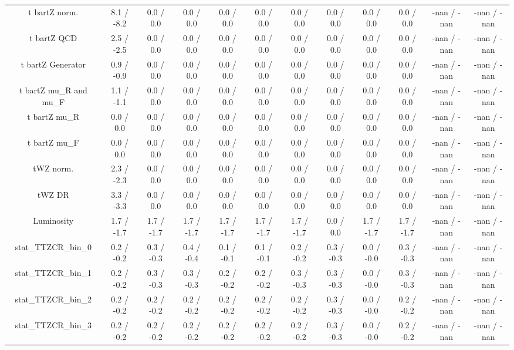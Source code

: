\begin{table}[htbp]
\begin{center}
\begin{tabular}{|c|c|c|c|c|c|c|c|c|c|c|c|}
  t bar{t}Z norm. & 8.1 / -8.2 & 0.0 / 0.0 & 0.0 / 0.0 & 0.0 / 0.0 & 0.0 / 0.0 & 0.0 / 0.0 & 0.0 / 0.0 & 0.0 / 0.0 & 0.0 / 0.0 & -nan / -nan & -nan / -nan \\ 
  t bar{t}Z QCD & 2.5 / -2.5 & 0.0 / 0.0 & 0.0 / 0.0 & 0.0 / 0.0 & 0.0 / 0.0 & 0.0 / 0.0 & 0.0 / 0.0 & 0.0 / 0.0 & 0.0 / 0.0 & -nan / -nan & -nan / -nan \\ 
  t bar{t}Z Generator & 0.9 / -0.9 & 0.0 / 0.0 & 0.0 / 0.0 & 0.0 / 0.0 & 0.0 / 0.0 & 0.0 / 0.0 & 0.0 / 0.0 & 0.0 / 0.0 & 0.0 / 0.0 & -nan / -nan & -nan / -nan \\ 
  t bar{t}Z  mu_{R} and  mu_{F} & 1.1 / -1.1 & 0.0 / 0.0 & 0.0 / 0.0 & 0.0 / 0.0 & 0.0 / 0.0 & 0.0 / 0.0 & 0.0 / 0.0 & 0.0 / 0.0 & 0.0 / 0.0 & -nan / -nan & -nan / -nan \\ 
  t bar{t}Z  mu_{R} & 0.0 / 0.0 & 0.0 / 0.0 & 0.0 / 0.0 & 0.0 / 0.0 & 0.0 / 0.0 & 0.0 / 0.0 & 0.0 / 0.0 & 0.0 / 0.0 & 0.0 / 0.0 & -nan / -nan & -nan / -nan \\ 
  t bar{t}Z  mu_{F} & 0.0 / 0.0 & 0.0 / 0.0 & 0.0 / 0.0 & 0.0 / 0.0 & 0.0 / 0.0 & 0.0 / 0.0 & 0.0 / 0.0 & 0.0 / 0.0 & 0.0 / 0.0 & -nan / -nan & -nan / -nan \\ 
  tWZ norm. & 2.3 / -2.3 & 0.0 / 0.0 & 0.0 / 0.0 & 0.0 / 0.0 & 0.0 / 0.0 & 0.0 / 0.0 & 0.0 / 0.0 & 0.0 / 0.0 & 0.0 / 0.0 & -nan / -nan & -nan / -nan \\ 
  tWZ DR & 3.3 / -3.3 & 0.0 / 0.0 & 0.0 / 0.0 & 0.0 / 0.0 & 0.0 / 0.0 & 0.0 / 0.0 & 0.0 / 0.0 & 0.0 / 0.0 & 0.0 / 0.0 & -nan / -nan & -nan / -nan \\ 
  Luminosity & 1.7 / -1.7 & 1.7 / -1.7 & 1.7 / -1.7 & 1.7 / -1.7 & 1.7 / -1.7 & 1.7 / -1.7 & 0.0 / 0.0 & 1.7 / -1.7 & 1.7 / -1.7 & -nan / -nan & -nan / -nan \\ 
 stat_TTZCR_bin_0 & 0.2 / -0.2 & 0.3 / -0.3 & 0.4 / -0.4 & 0.1 / -0.1 & 0.1 / -0.1 & 0.2 / -0.2 & 0.3 / -0.3 & 0.0 / -0.0 & 0.3 / -0.3 & -nan / -nan & -nan / -nan \\ 
 stat_TTZCR_bin_1 & 0.2 / -0.2 & 0.3 / -0.3 & 0.3 / -0.3 & 0.2 / -0.2 & 0.2 / -0.2 & 0.3 / -0.3 & 0.3 / -0.3 & 0.0 / -0.0 & 0.3 / -0.3 & -nan / -nan & -nan / -nan \\ 
 stat_TTZCR_bin_2 & 0.2 / -0.2 & 0.2 / -0.2 & 0.2 / -0.2 & 0.2 / -0.2 & 0.2 / -0.2 & 0.2 / -0.2 & 0.3 / -0.3 & 0.0 / -0.0 & 0.2 / -0.2 & -nan / -nan & -nan / -nan \\ 
 stat_TTZCR_bin_3 & 0.2 / -0.2 & 0.2 / -0.2 & 0.2 / -0.2 & 0.2 / -0.2 & 0.2 / -0.2 & 0.2 / -0.2 & 0.3 / -0.3 & 0.0 / -0.0 & 0.2 / -0.2 & -nan / -nan & -nan / -nan \\ 

\end{tabular}
\end{center}
\end{table}
